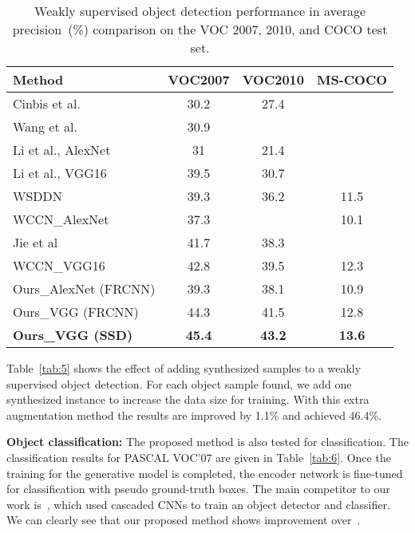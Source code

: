 \documentclass[runningheads]{llncs}
\begin{document}
\begin{table}[t]
{\small
\tabcolsep=0.3cm
\caption{Weakly supervised object detection performance in average precision~(\%) comparison on the VOC 2007, 2010, and COCO test set.}
 \label{tab:4}
\begin{center}
\begin{tabular}{lccc}
\toprule
Method &  VOC2007 & VOC2010 & MS-COCO \\
\midrule
Cinbis et al.~\cite{cinbis} &30.2& 27.4 &  \\
Wang et al.~\cite{wang14}& 30.9& &    \\
Li et al., AlexNet~\cite{li16}& 31& 21.4 &   \\
Li et al., VGG16~\cite{li16} & 39.5& 30.7 &   \\
WSDDN~\cite{bilen16} & 39.3& 36.2 & 11.5   \\
WCCN\_AlexNet~\cite{diba} & 37.3 &  & 10.1 \\
Jie et al~\cite{jieSelf} & {41.7} & {38.3} & \\
WCCN\_VGG16~\cite{diba} & 42.8 & 39.5 & 12.3  \\
\midrule
Ours\_AlexNet (FRCNN)  & 39.3 & 38.1 & 10.9 \\
Ours\_VGG (FRCNN) & 44.3 & {41.5} &  12.8 \\
\textbf{Ours\_VGG (SSD)} & \textbf{45.4}& \textbf{43.2}  &  \textbf{13.6} \\
\bottomrule
\end{tabular}
\end{center}}
\vspace{-0.5cm}
\end{table}


Table~\ref{tab:5} shows the effect of adding synthesized samples to a weakly supervised object detection. For each object sample found, we add one synthesized instance to increase the data size for training. With this extra augmentation method the results are improved by 1.1\% and achieved 46.4\%.

\textbf{Object classification:} The proposed method is also tested for classification. The classification results for PASCAL VOC'07 are given in Table~\ref{tab:6}. Once the training for the generative model is completed, the encoder network is fine-tuned for classification with pseudo ground-truth boxes. The main competitor to our work is~\cite{diba}, which used cascaded CNNs to train an object detector and classifier. We can clearly see that our proposed method shows improvement over~\cite{diba}.
\end{document}
